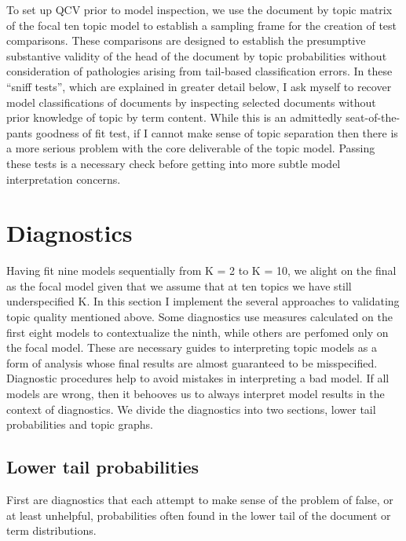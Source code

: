 \documentclass[]{book}
\theoremstyle{definition}
\theoremstyle{definition}
\theoremstyle{definition}
\theoremstyle{remark}
\begin{document}
To set up QCV prior to model inspection, we use the document by topic
matrix of the focal ten topic model to establish a sampling frame for
the creation of test comparisons. These comparisons are designed to
establish the presumptive substantive validity of the head of the
document by topic probabilities without consideration of pathologies
arising from tail-based classification errors. In these ``sniff tests'',
which are explained in greater detail below, I ask myself to recover
model classifications of documents by inspecting selected documents
without prior knowledge of topic by term content. While this is an
admittedly seat-of-the-pants goodness of fit test, if I cannot make
sense of topic separation then there is a more serious problem with the
core deliverable of the topic model. Passing these tests is a necessary
check before getting into more subtle model interpretation concerns.

\hypertarget{diagnostics}{%
\section{Diagnostics}\label{diagnostics}}

Having fit nine models sequentially from K = 2 to K = 10, we alight on
the final as the focal model given that we assume that at ten topics we
have still underspecified K. In this section I implement the several
approaches to validating topic quality mentioned above. Some diagnostics
use measures calculated on the first eight models to contextualize the
ninth, while others are perfomed only on the focal model. These are
necessary guides to interpreting topic models as a form of analysis
whose final results are almost guaranteed to be misspecified. Diagnostic
procedures help to avoid mistakes in interpreting a bad model. If all
models are wrong, then it behooves us to always interpret model results
in the context of diagnostics. We divide the diagnostics into two
sections, lower tail probabilities and topic graphs.

\hypertarget{lower-tail-probabilities}{%
\subsection{Lower tail probabilities}\label{lower-tail-probabilities}}

First are diagnostics that each attempt to make sense of the problem of
false, or at least unhelpful, probabilities often found in the lower
tail of the document or term distributions.
\end{document}
